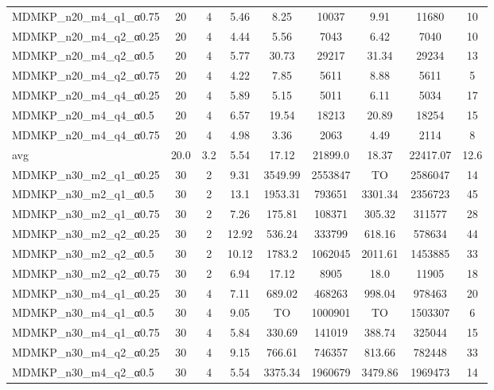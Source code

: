 \begin{table}[!ht]
{\begin{tabular}{lcccccccc}
MDMKP\_n20\_m4\_q1\_α0.75 & 20 & 4 &  \textcolor{blue2}{5.46} & 8.25 & 10037 & 9.91 & 11680 & 10 \\
MDMKP\_n20\_m4\_q2\_α0.25 & 20 & 4 &  \textcolor{blue2}{4.44} & 5.56 & 7043 & 6.42 & 7040 & 10 \\
MDMKP\_n20\_m4\_q2\_α0.5 & 20 & 4 &  \textcolor{blue2}{5.77} & 30.73 & 29217 & 31.34 & 29234 & 13 \\
MDMKP\_n20\_m4\_q2\_α0.75 & 20 & 4 &  \textcolor{blue2}{4.22} & 7.85 & 5611 & 8.88 & 5611 & 5 \\
MDMKP\_n20\_m4\_q4\_α0.25 & 20 & 4 & 5.89 &  \textcolor{blue2}{5.15} & 5011 & 6.11 & 5034 & 17 \\
MDMKP\_n20\_m4\_q4\_α0.5 & 20 & 4 &  \textcolor{blue2}{6.57} & 19.54 & 18213 & 20.89 & 18254 & 15 \\
MDMKP\_n20\_m4\_q4\_α0.75 & 20 & 4 & 4.98 &  \textcolor{blue2}{3.36} & 2063 & 4.49 & 2114 & 8 \\
\cline{1-9} avg & 20.0 & 3.2 & 5.54 & 17.12& 21899.0 & 18.37& 22417.07 & 12.6\\ \cline{1-9}
MDMKP\_n30\_m2\_q1\_α0.25 & 30 & 2 &  \textcolor{blue2}{9.31} & 3549.99 & 2553847 & TO & 2586047 & 14 \\
MDMKP\_n30\_m2\_q1\_α0.5 & 30 & 2 &  \textcolor{blue2}{13.1} & 1953.31 & 793651 & 3301.34 & 2356723 & 45 \\
MDMKP\_n30\_m2\_q1\_α0.75 & 30 & 2 &  \textcolor{blue2}{7.26} & 175.81 & 108371 & 305.32 & 311577 & 28 \\
MDMKP\_n30\_m2\_q2\_α0.25 & 30 & 2 &  \textcolor{blue2}{12.92} & 536.24 & 333799 & 618.16 & 578634 & 44 \\
MDMKP\_n30\_m2\_q2\_α0.5 & 30 & 2 &  \textcolor{blue2}{10.12} & 1783.2 & 1062045 & 2011.61 & 1453885 & 33 \\
MDMKP\_n30\_m2\_q2\_α0.75 & 30 & 2 &  \textcolor{blue2}{6.94} & 17.12 & 8905 & 18.0 & 11905 & 18 \\
MDMKP\_n30\_m4\_q1\_α0.25 & 30 & 4 &  \textcolor{blue2}{7.11} & 689.02 & 468263 & 998.04 & 978463 & 20 \\
MDMKP\_n30\_m4\_q1\_α0.5 & 30 & 4 &  \textcolor{blue2}{9.05} & TO & 1000901 & TO & 1503307 & 6 \\
MDMKP\_n30\_m4\_q1\_α0.75 & 30 & 4 &  \textcolor{blue2}{5.84} & 330.69 & 141019 & 388.74 & 325044 & 15 \\
MDMKP\_n30\_m4\_q2\_α0.25 & 30 & 4 &  \textcolor{blue2}{9.15} & 766.61 & 746357 & 813.66 & 782448 & 33 \\
MDMKP\_n30\_m4\_q2\_α0.5 & 30 & 4 &  \textcolor{blue2}{5.54} & 3375.34 & 1960679 & 3479.86 & 1969473 & 14 \\

\end{tabular}}
\end{table}
